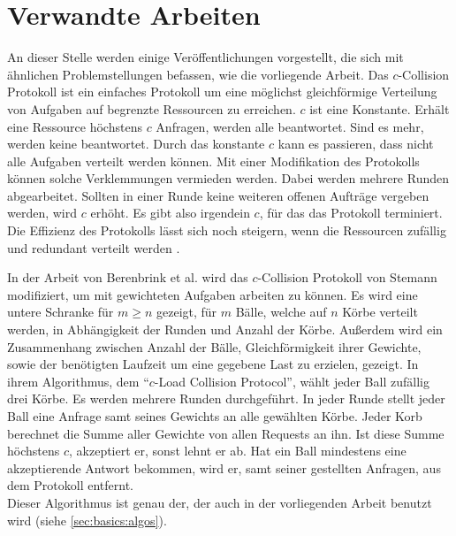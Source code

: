 \chapter{Verwandte Arbeiten}
\label{chap:relwork}
An dieser Stelle werden einige Veröffentlichungen vorgestellt, die sich mit ähnlichen Problemstellungen befassen, wie die vorliegende Arbeit.
%
%
Das $c$-Collision Protokoll \cite{ccol3} ist ein einfaches Protokoll um eine möglichst gleichförmige Verteilung von Aufgaben auf begrenzte Ressourcen zu erreichen. $c$ ist eine Konstante. Erhält eine Ressource höchstens $c$ Anfragen, werden alle beantwortet. Sind es mehr, werden keine beantwortet. Durch das konstante $c$ kann es passieren, dass nicht alle Aufgaben verteilt werden können. Mit einer Modifikation des Protokolls können solche Verklemmungen vermieden werden. Dabei werden mehrere Runden abgearbeitet. Sollten in einer Runde keine weiteren offenen Aufträge vergeben werden, wird $c$ erhöht. Es gibt also irgendein $c$, für das das Protokoll terminiert. Die Effizienz des Protokolls lässt sich noch steigern, wenn die Ressourcen zufällig und redundant verteilt werden \cite{ccol4}.

In der Arbeit von Berenbrink et al. \cite{ccol2} wird das $c$-Collision Protokoll von Stemann \cite{ccol3} modifiziert, um mit gewichteten Aufgaben arbeiten zu können. Es wird eine untere Schranke für $m \ge n$ gezeigt, für $m$ Bälle, welche auf $n$ Körbe verteilt werden, in Abhängigkeit der Runden und Anzahl der Körbe. Außerdem wird ein Zusammenhang zwischen Anzahl der Bälle, Gleichförmigkeit ihrer Gewichte, sowie der benötigten Laufzeit um eine gegebene Last zu erzielen, gezeigt. In ihrem Algorithmus, dem "`$c$-Load Collision Protocol"', wählt jeder Ball zufällig drei Körbe. Es werden mehrere Runden durchgeführt. In jeder Runde stellt jeder Ball eine Anfrage samt seines Gewichts an alle gewählten Körbe. Jeder Korb berechnet die Summe aller Gewichte von allen Requests an ihn. Ist diese Summe höchstens $c$, akzeptiert er, sonst lehnt er ab. Hat ein Ball mindestens eine akzeptierende Antwort bekommen, wird er, samt seiner gestellten Anfragen, aus dem Protokoll entfernt.\\
Dieser Algorithmus ist genau der, der auch in der vorliegenden Arbeit benutzt wird (siehe \ref{sec:basics:algos}).
